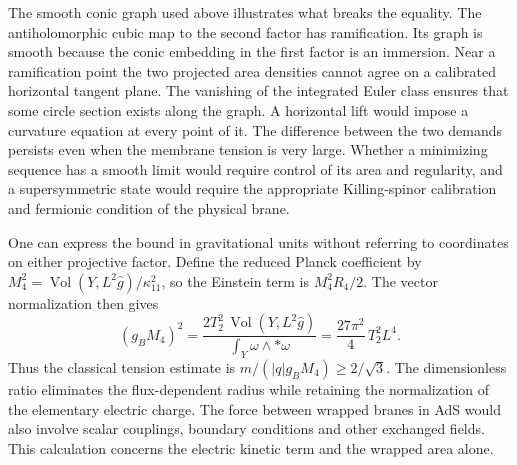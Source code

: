 \documentclass[aps,prd,reprint,onecolumn,nofootinbib,amsmath,amssymb]{revtex4-2}
\begin{document}
The smooth conic graph used above illustrates what breaks the equality. The antiholomorphic cubic map to the second factor has ramification. Its graph is smooth because the conic embedding in the first factor is an immersion. Near a ramification point the two projected area densities cannot agree on a calibrated horizontal tangent plane. The vanishing of the integrated Euler class ensures that some circle section exists along the graph. A horizontal lift would impose a curvature equation at every point of it. The difference between the two demands persists even when the membrane tension is very large. Whether a minimizing sequence has a smooth limit would require control of its area and regularity, and a supersymmetric state would require the appropriate Killing-spinor calibration and fermionic condition of the physical brane.

One can express the bound in gravitational units without referring to coordinates on either projective factor. Define the reduced Planck coefficient by $M_4^2=\operatorname{Vol}(Y,L^2\hat g)/\kappa_{11}^2$, so the Einstein term is $M_4^2R_4/2$. The vector normalization then gives
\begin{equation}
 (g_B M_4)^2=
 \frac{2T_2^2\,\operatorname{Vol}(Y,L^2\hat g)}
      {\int_Y\omega\wedge *\omega}
 =\frac{27\pi^2}{4}\,T_2^2 L^4 .
\end{equation}
Thus the classical tension estimate is $m/(|q|g_B M_4)\ge 2/\sqrt3$. The dimensionless ratio eliminates the flux-dependent radius while retaining the normalization of the elementary electric charge. The force between wrapped branes in AdS would also involve scalar couplings, boundary conditions and other exchanged fields. This calculation concerns the electric kinetic term and the wrapped area alone.
\end{document}
